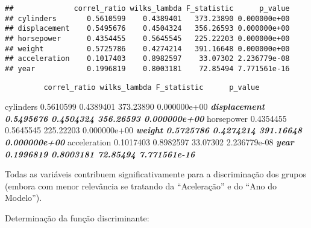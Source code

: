 \documentclass[]{article}
\newenvironment{Shaded}{\begin{snugshade}}{\end{snugshade}}
\newcommand{\KeywordTok}[1]{\textcolor[rgb]{0.13,0.29,0.53}{\textbf{#1}}}
\newcommand{\DataTypeTok}[1]{\textcolor[rgb]{0.13,0.29,0.53}{#1}}
\newcommand{\DecValTok}[1]{\textcolor[rgb]{0.00,0.00,0.81}{#1}}
\newcommand{\StringTok}[1]{\textcolor[rgb]{0.31,0.60,0.02}{#1}}
\newcommand{\OperatorTok}[1]{\textcolor[rgb]{0.81,0.36,0.00}{\textbf{#1}}}
\newcommand{\NormalTok}[1]{#1}
\begin{document}
\begin{Shaded}
\end{Shaded}

\begin{verbatim}
##              correl_ratio wilks_lambda F_statistic      p_value
## cylinders       0.5610599    0.4389401   373.23890 0.000000e+00
## displacement    0.5495676    0.4504324   356.26593 0.000000e+00
## horsepower      0.4354455    0.5645545   225.22203 0.000000e+00
## weight          0.5725786    0.4274214   391.16648 0.000000e+00
## acceleration    0.1017403    0.8982597    33.07302 2.236779e-08
## year            0.1996819    0.8003181    72.85494 7.771561e-16
\end{verbatim}

\begin{verbatim}
         correl_ratio wilks_lambda F_statistic      p_value
\end{verbatim}

cylinders 0.5610599 0.4389401 373.23890 0.000000e+00 \textbf{\emph{
displacement 0.5495676 0.4504324 356.26593 0.000000e+00 }} horsepower
0.4354455 0.5645545 225.22203 0.000000e+00 \textbf{\emph{ weight
0.5725786 0.4274214 391.16648 0.000000e+00 }} acceleration 0.1017403
0.8982597 33.07302 2.236779e-08 \textbf{\emph{ year 0.1996819 0.8003181
72.85494 7.771561e-16 }}

Todas as variáveis contribuem significativamente para a discriminação
dos grupos (embora com menor relevância se tratando da ``Aceleração'' e
do ``Ano do Modelo'').

Determinação da função discriminante:

\begin{Shaded}
\end{Shaded}
\end{document}
